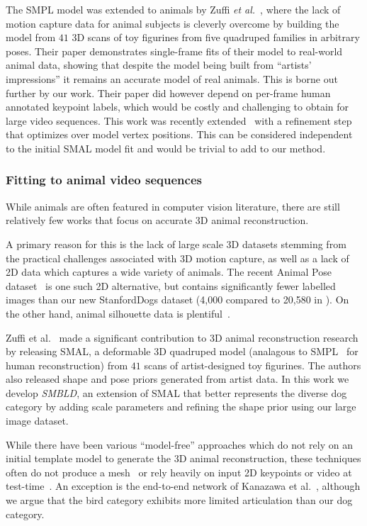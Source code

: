 The SMPL model was extended to animals by Zuffi {\em et al.}~\cite{zuffi2017menagerie}, where the lack of motion capture data for animal subjects is cleverly overcome by building the model from $41$ 3D scans of toy figurines from five quadruped families in arbitrary poses. Their paper demonstrates single-frame fits of their model to real-world animal data, showing that despite the model being built from ``artists' impressions'' it remains an accurate model of real animals. This is borne out further by our work.  Their paper did however depend on per-frame human annotated keypoint labels, which would be costly and challenging to obtain for large video sequences. This work was recently extended~\cite{zuffi_lions} with a refinement step that optimizes over model vertex positions. This can be considered independent to the initial SMAL model fit and would be trivial to add to our method.


\subsubsection{Fitting to animal video sequences}

While animals are often featured in computer vision literature, there are still relatively few works that focus on accurate 3D animal reconstruction. 

A primary reason for this is the lack of large scale 3D datasets stemming from the practical challenges associated with 3D motion capture, as well as a lack of 2D data which captures a wide variety of animals. The recent Animal Pose dataset~\cite{animalpose} is one such 2D alternative, but contains significantly fewer labelled images than our new StanfordDogs dataset (4,000 compared to 20,580 in ). 
On the other hand, animal silhouette data is plentiful~\cite{lin2014microsoft,everingham2010pascal,DAVIS2017-2nd}.

Zuffi et al.~\cite{zuffi2017menagerie} made a significant contribution to 3D animal reconstruction research by releasing SMAL, a deformable 3D quadruped model (analagous to SMPL~\cite{loper15smpl} for human reconstruction) from $41$ scans of artist-designed toy figurines. The authors also released shape and pose priors generated from artist data. In this work we develop \emph{SMBLD}, an extension of SMAL that better represents the diverse dog category by adding scale parameters and refining the shape prior using our large image dataset.

While there have been various ``model-free'' approaches which do not rely on an initial template model to generate the 3D animal reconstruction, these techniques often do not produce a mesh~\cite{Agudo_2018_CVPR,novotny19c3dpo} or rely heavily on input 2D keypoints or video at test-time~\cite{vicente_3dv,Probst2018_ECCVa}. An exception is the end-to-end network of Kanazawa et al.~\cite{kanazawa2018birds}, although we argue that the bird category exhibits more limited articulation than our dog category.

